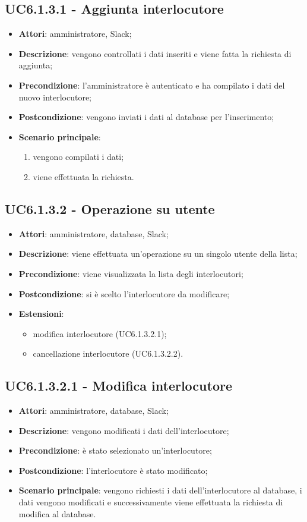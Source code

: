 \documentclass[../AnalisiDeiRequisiti.tex]{subfiles}
\begin{document}
\subsection{UC6.1.3.1 - Aggiunta interlocutore} 
\label{sssec:UC6.1.3.1} 
\begin{itemize} 
\item \textbf{Attori}: amministratore, Slack;
\item \textbf{Descrizione}: vengono controllati i dati inseriti e viene fatta la richiesta di aggiunta;
\item \textbf{Precondizione}: l'amministratore è autenticato e ha compilato i dati del nuovo interlocutore;
\item \textbf{Postcondizione}: vengono inviati i dati al database per l'inserimento;
\item \textbf{Scenario principale}: 
	\begin{enumerate}
		\item vengono compilati i dati;
		\item viene effettuata la richiesta.
	\end{enumerate} 
\end{itemize} 
\subsection{UC6.1.3.2 - Operazione su utente} 
\label{sssec:UC6.1.3.2} 
\begin{itemize} 
\item \textbf{Attori}: amministratore, database, Slack;
\item \textbf{Descrizione}: viene effettuata un'operazione su un singolo utente della lista;
\item \textbf{Precondizione}: viene visualizzata la lista degli interlocutori;
\item \textbf{Postcondizione}: si è scelto l'interlocutore da modificare;
\item \textbf{Estensioni}:\begin{itemize}\item modifica interlocutore (UC6.1.3.2.1);\item cancellazione interlocutore (UC6.1.3.2.2).\end{itemize}
\end{itemize} 
\subsection{UC6.1.3.2.1 - Modifica interlocutore} 
\label{sssec:UC6.1.3.2.1} 
\begin{itemize} 
\item \textbf{Attori}: amministratore, database, Slack;
\item \textbf{Descrizione}: vengono modificati i dati dell'interlocutore;
\item \textbf{Precondizione}: è stato selezionato un'interlocutore;
\item \textbf{Postcondizione}: l'interlocutore è stato modificato;
\item \textbf{Scenario principale}: vengono richiesti i dati dell'interlocutore al database, i dati vengono modificati e successivamente viene effettuata la richiesta di modifica al database.\end{itemize} 
\end{document}

